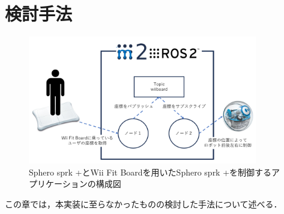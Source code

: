 \chapter{検討手法}
\begin{figure}[ht]
    \centering
    \includegraphics[width=10cm]{images/fig3_application_structure.png}
    \caption{Sphero sprk +とWii Fit Boardを用いたSphero sprk +を制御するアプリケーションの構成図}
    \label{fig:sphero sprk}
\end{figure}
この章では，本実装に至らなかったものの検討した手法について述べる．
